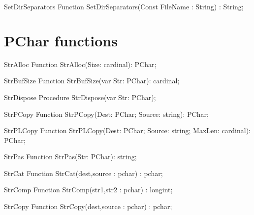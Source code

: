  
\begin{function}{SetDirSeparators}
\Declaration
Function SetDirSeparators(Const FileName : String) : String;
\Description
\Errors
\SeeAlso
\end{function}

 

\section{PChar functions}

\begin{function}{StrAlloc}
\Declaration
Function StrAlloc(Size: cardinal): PChar;
\Description
\Errors
\SeeAlso
\end{function}

 
\begin{function}{StrBufSize}
\Declaration
Function StrBufSize(var Str: PChar): cardinal;
\Description
\Errors
\SeeAlso
\end{function}

 
\begin{procedure}{StrDispose}
\Declaration
Procedure StrDispose(var Str: PChar);
\Description
\Errors
\SeeAlso
\end{procedure}

 
\begin{function}{StrPCopy}
\Declaration
Function StrPCopy(Dest: PChar; Source: string): PChar;
\Description
\Errors
\SeeAlso
\end{function}

 
\begin{function}{StrPLCopy}
\Declaration
Function StrPLCopy(Dest: PChar; Source: string; MaxLen: cardinal): PChar;
\Description
\Errors
\SeeAlso
\end{function}

 
\begin{function}{StrPas}
\Declaration
Function StrPas(Str: PChar): string;
\Description
\Errors
\SeeAlso
\end{function}

 
\begin{function}{StrCat}
\Declaration
Function StrCat(dest,source : pchar) : pchar;
\Description
\Errors
\SeeAlso
\end{function}

 
\begin{function}{StrComp}
\Declaration
Function StrComp(str1,str2 : pchar) : longint;
\Description
\Errors
\SeeAlso
\end{function}

 
\begin{function}{StrCopy}
\Declaration
Function StrCopy(dest,source : pchar) : pchar;
\Description
\Errors
\SeeAlso
\end{function}

